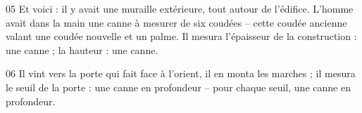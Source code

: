 
05 Et voici : il y avait une muraille extérieure, tout autour de l’édifice. L’homme avait dans la main une canne à mesurer de six coudées – cette coudée ancienne valant une coudée nouvelle et un palme. Il mesura l’épaisseur de la construction : une canne ; la hauteur : une canne.

06 Il vint vers la porte qui fait face à l’orient, il en monta les marches ; il mesura le seuil de la porte : une canne en profondeur – pour chaque seuil, une canne en profondeur.